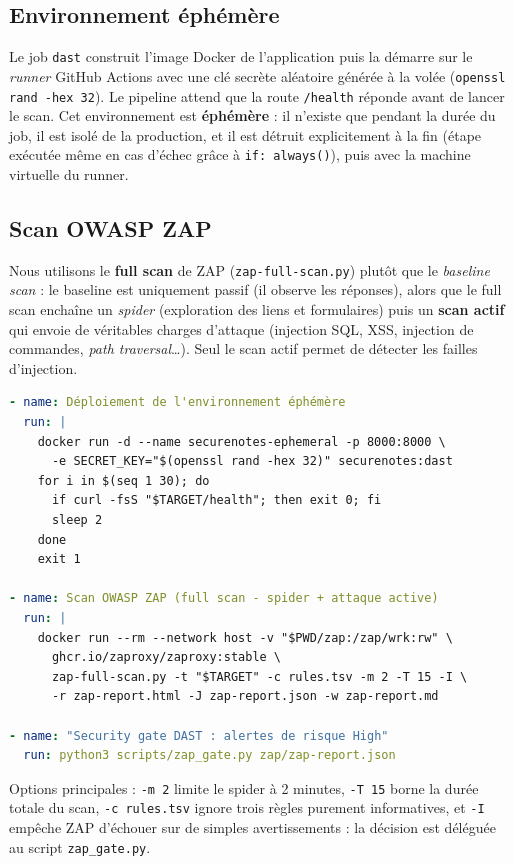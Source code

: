 \documentclass[11pt,a4paper]{article}
\newcommand{\fichier}[1]{\texttt{#1}}
\begin{document}
\subsection{Environnement éphémère}

Le job \fichier{dast} construit l'image Docker de l'application puis la démarre sur le
\emph{runner} GitHub Actions avec une clé secrète aléatoire générée à la volée
(\fichier{openssl rand -hex 32}). Le pipeline attend que la route \fichier{/health} réponde avant de
lancer le scan. Cet environnement est \textbf{éphémère} : il n'existe que pendant la durée du job, il
est isolé de la production, et il est détruit explicitement à la fin (étape exécutée même en cas
d'échec grâce à \fichier{if: always()}), puis avec la machine virtuelle du runner.

\subsection{Scan OWASP ZAP}

Nous utilisons le \textbf{full scan} de ZAP (\fichier{zap-full-scan.py}) plutôt que le
\emph{baseline scan} : le baseline est uniquement passif (il observe les réponses), alors que le
full scan enchaîne un \emph{spider} (exploration des liens et formulaires) puis un \textbf{scan
actif} qui envoie de véritables charges d'attaque (injection SQL, XSS, injection de commandes,
\emph{path traversal}\ldots). Seul le scan actif permet de détecter les failles d'injection.

\begin{lstlisting}[language=yaml, caption={Déploiement éphémère et scan ZAP}]
- name: Déploiement de l'environnement éphémère
  run: |
    docker run -d --name securenotes-ephemeral -p 8000:8000 \
      -e SECRET_KEY="$(openssl rand -hex 32)" securenotes:dast
    for i in $(seq 1 30); do
      if curl -fsS "$TARGET/health"; then exit 0; fi
      sleep 2
    done
    exit 1

- name: Scan OWASP ZAP (full scan - spider + attaque active)
  run: |
    docker run --rm --network host -v "$PWD/zap:/zap/wrk:rw" \
      ghcr.io/zaproxy/zaproxy:stable \
      zap-full-scan.py -t "$TARGET" -c rules.tsv -m 2 -T 15 -I \
      -r zap-report.html -J zap-report.json -w zap-report.md

- name: "Security gate DAST : alertes de risque High"
  run: python3 scripts/zap_gate.py zap/zap-report.json
\end{lstlisting}

Options principales : \fichier{-m 2} limite le spider à 2 minutes, \fichier{-T 15} borne la durée
totale du scan, \fichier{-c rules.tsv} ignore trois règles purement informatives, et \fichier{-I}
empêche ZAP d'échouer sur de simples avertissements : la décision est déléguée au script
\fichier{zap\_gate.py}.
\end{document}
